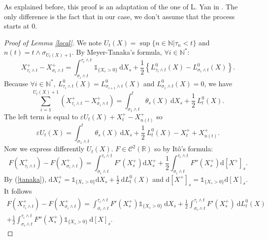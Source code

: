 \documentclass[11pt]{enstaPRE}
\newcommand{\R}{\mathbb{R}}
\newcommand{\N}{\mathbb{N}}
\newcommand{\di}{\mathrm{d}}
\begin{document}
As explained before, this proof is an adaptation of the one of L. Yan in \cite{Yan}. The only difference is the fact that in our case, we don't assume that the process starts at 0.
\begin{proof}[Proof of Lemma \ref{local}]
    We note $U_t(X) = \sup\{n\in\N|\tau_n<t\}$ and $n(t) = t \wedge \sigma_{U_t(X)+1}$. By Meyer-Tanaka's formula, $\forall i\in \N^*$:        
    \begin{equation}\label{tanaka}
    X^+_{\tau_i\wedge t} - X^+_{\sigma_i\wedge t} = \int_{\sigma_i\wedge t}^{\tau_i\wedge t} \mathds{1}_{\{X_s>0\}}\ \di X_s + \frac{1}{2}\left\{L^0_{\tau_i\wedge t}(X)-L^0_{\sigma_i\wedge t}(X)\right\}.
    \end{equation}        
    Because $\forall i\in\N^*,\ L^0_{\tau_{i}\wedge t}(X)=L^0_{\sigma_{i+1}\wedge t}(X)$ and $L^0_{\sigma_1\wedge t}(X)=0$, we have        
    \begin{equation*}
    \sum_{i=1}^{U_t(X)+1}\left(X^+_{\tau_i\wedge t} - X^+_{\sigma_i\wedge t}\right) = \int_{\sigma_1\wedge t}^{t} \theta_s(X)\ \di X_s + \frac{1}{2}\ L^0_{t}(X).
    \end{equation*}
    The left term is equal to $\varepsilon U_t(X)+X^+_t-X^+_{n(t)}$ so
    \begin{equation}\label{Ut}
    \varepsilon U_t(X) = \int_{\sigma_1\wedge t}^{t} \theta_s(X)\ \di X_s + \frac{1}{2}\ L^0_{t}(X) - X^+_t + X^+_{n(t)}.
    \end{equation}
    Now we express differently $U_t(X)$. $F\in\mathcal{C}^2(\R)$ so by Itô's formula:
    \begin{equation*}
    F\left(X^+_{\tau_i\wedge t}\right) - F\left(X^+_{\sigma_i\wedge t}\right) = \int_{\sigma_i\wedge t}^{\tau_i\wedge t} F'\left(X_s^+\right) \di X_s^+ + \frac{1}{2}\int_{\sigma_i\wedge t}^{\tau_i\wedge t} F''\left(X_s^+\right) \di [X^+]_s.
    \end{equation*}
    By (\ref{tanaka}), $\di X_s^+ = \mathds{1}_{\{X_s>0\}}\di X_s + \frac{1}{2}\ \di L^0_t(X)$ and $\di[X^+]_s = \mathds{1}_{\{X_s>0\}}\di[X]_s$. It follows
    \begin{multline*}
    F\left(X^+_{\tau_i\wedge t}\right) - F\left(X^+_{\sigma_i\wedge t}\right) = \int_{\sigma_i\wedge t}^{\tau_i\wedge t} F'\left(X_s^+\right) \mathds{1}_{\{X_s>0\}}\ \di X_s + \frac{1}{2}\int_{\sigma_i\wedge t}^{\tau_i\wedge t} F'(X_s^+)\ \di L^0_t(X)\\ + \frac{1}{2}\int_{\sigma_i\wedge t}^{\tau_i\wedge t} F''\left(X_s^+\right) \mathds{1}_{\{X_s>0\}}\ \di [X]_s.
    \end{multline*}

\end{proof}
\end{document}
